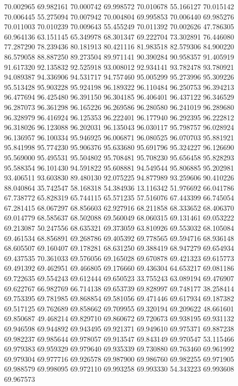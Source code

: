 70.002965
69.982161
70.000742
69.998572
70.010678
55.166127
70.015142
70.006445
55.275094
70.007942
70.004804
69.995853
70.006440
69.985276
70.011003
70.010239
70.009643
55.455249
70.011392
70.002626
47.786305
60.964136
63.151145
65.349978
68.301347
69.222704
73.302891
76.446080
77.287290
78.239436
80.181913
80.421116
81.983518
82.579306
84.900220
86.579058
88.887250
89.273504
89.971141
90.390284
90.958357
91.405919
91.617320
92.135832
92.525918
93.008012
92.934141
93.782478
93.780921
94.089387
94.336906
94.531717
94.757460
95.005299
95.273996
95.309226
95.513428
95.903228
95.924198
96.189322
96.110484
96.250753
96.394213
96.477694
96.425480
96.391150
96.304185
96.406401
96.437122
96.346529
96.287073
96.361298
96.165226
96.269586
96.280580
96.241019
96.289680
96.328979
96.416924
96.125353
96.222401
96.177940
96.292395
96.222812
96.318026
96.123088
96.202031
96.135043
96.030117
95.798757
96.028924
96.136957
96.100334
95.946925
96.006871
96.080525
96.070703
95.881921
95.841998
95.774230
95.906376
95.633680
95.691796
95.324227
96.126690
95.569000
95.495531
95.504802
95.708481
95.708230
95.656458
95.828293
95.588354
96.101430
94.591822
95.608881
94.549544
95.806885
95.202981
93.406511
93.603830
89.480130
92.075225
94.877989
93.259606
90.410226
88.040864
35.742547
58.168318
54.384936
13.116342
51.976692
66.041786
67.738772
65.828319
65.744115
65.571235
57.516076
67.443399
66.745054
67.281415
68.067297
68.856603
62.927916
68.211858
68.333652
68.406370
69.014779
68.585637
68.502088
69.560049
68.060315
69.131461
69.053222
69.213087
50.247556
68.635321
69.373059
63.810926
69.553032
68.105084
69.461534
68.856891
69.268786
69.405392
69.778565
69.594716
68.936148
68.605507
69.160407
69.178281
68.631250
69.388419
68.947279
69.654934
69.437535
70.361033
69.576056
69.165028
69.670878
69.421323
69.615773
69.491392
69.462951
69.466805
69.176660
69.436304
64.653217
69.081186
69.722635
69.554243
69.612444
69.650523
33.755243
63.089194
69.476907
69.622767
66.982769
66.714138
69.653739
69.828997
69.748177
38.258414
69.753395
69.781985
69.868854
69.581056
69.471446
69.617934
69.187382
69.517125
69.762689
69.858662
69.709955
69.320194
69.209622
48.661601
69.850687
49.468214
69.829710
69.860672
69.720673
69.938195
69.931132
69.946598
69.944892
69.943495
69.921371
69.949610
69.975371
69.887238
69.982237
69.985644
69.978057
69.913547
69.843149
69.970547
53.115466
69.979383
69.959329
69.979640
69.935339
69.730880
69.763460
69.961992
69.979304
69.977716
69.926578
69.987900
69.986760
69.982255
69.971905
69.988579
69.998095
69.972110
69.993258
69.993330
54.343223
69.993608
69.967573
